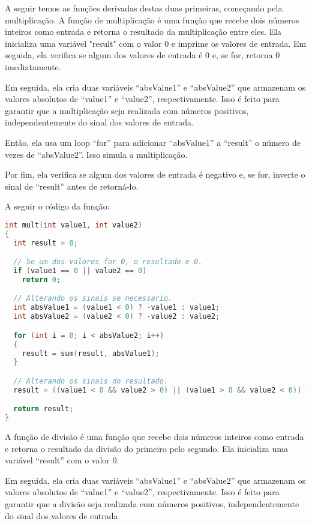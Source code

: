 \documentclass{article}
\begin{document}
A seguir temos as funções derivadas destas duas primeiras, começando pela multiplicação. A função de multiplicação é uma função que recebe dois números inteiros como entrada e retorna o resultado da multiplicação entre eles. Ela inicializa uma variável "result" com o valor 0 e imprime os valores de entrada. Em seguida, ela verifica se algum dos valores de entrada é 0 e, se for, retorna 0 imediatamente.

Em seguida, ela cria duas variáveis “absValue1” e “absValue2” que armazenam os valores absolutos de “value1” e “value2”, respectivamente. Isso é feito para garantir que a multiplicação seja realizada com números positivos, independentemente do sinal dos valores de entrada.

Então, ela usa um loop “for” para adicionar “absValue1” a “result” o número de vezes de “absValue2”. Isso simula a multiplicação.

Por fim, ela verifica se algum dos valores de entrada é negativo e, se for, inverte o sinal de “result” antes de retorná-lo.

\hfill\breakline

\noindent A seguir o código da função:
 \begin{lstlisting}[caption={Função de multiplicação.},label={lst:cod3},language=C]
int mult(int value1, int value2)
{
  int result = 0;

  // Se um dos valores for 0, o resultado e 0.
  if (value1 == 0 || value2 == 0) 
    return 0;

  // Alterando os sinais se necessario.
  int absValue1 = (value1 < 0) ? -value1 : value1;
  int absValue2 = (value2 < 0) ? -value2 : value2;

  for (int i = 0; i < absValue2; i++)
  {
    result = sum(result, absValue1);
  }

  // Alterando os sinais do resultado.
  result = ((value1 < 0 && value2 > 0) || (value1 > 0 && value2 < 0)) ? -result : result;

  return result;
}
 \end{lstlisting}
 A função de divisão é uma função que recebe dois números inteiros como entrada e retorna o resultado da divisão do primeiro pelo segundo. Ela inicializa uma variável “result” com o valor 0.

Em seguida, ela cria duas variáveis “absValue1” e “absValue2” que armazenam os valores absolutos de “value1” e “value2”, respectivamente. Isso é feito para garantir que a divisão seja realizada com números positivos, independentemente do sinal dos valores de entrada.
\end{document}

